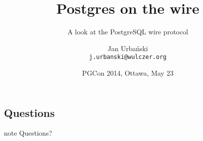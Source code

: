 \documentclass{beamer}
\title{Postgres on the wire}
\subtitle{A look at the PostgreSQL wire protocol}
\author[Jan Urbański]{Jan Urbański \\ \texttt{j.urbanski@wulczer.org}}
\institute{Ducksboard}
\date[PGCon 2014]{PGCon 2014, Ottawa, May 23}
\begin{document}
\frame{\titlepage}

\subsection*{Questions}

\begin{frame}
\begin{beamercolorbox}[center]{note}
  \Huge Questions?
\end{beamercolorbox}
\end{frame}
\end{document}
